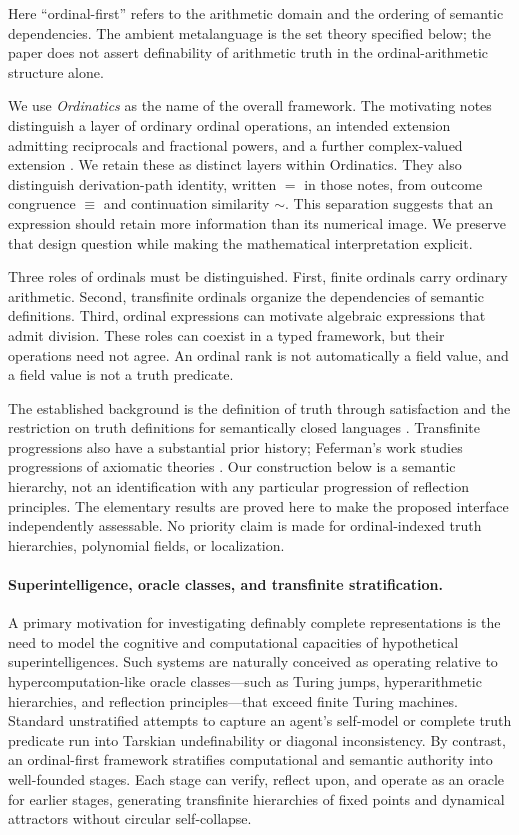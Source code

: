 \documentclass[11pt]{article}
\theoremstyle{definition}
\begin{document}
Here ``ordinal-first'' refers to the arithmetic domain and the ordering of semantic dependencies. The ambient metalanguage is the set theory specified below; the paper does not assert definability of arithmetic truth in the ordinal-arithmetic structure alone.

We use \emph{Ordinatics} as the name of the overall framework. The motivating notes distinguish a layer of ordinary ordinal operations, an intended extension admitting reciprocals and fractional powers, and a further complex-valued extension \cite{roost}. We retain these as distinct layers within Ordinatics. They also distinguish derivation-path identity, written $=$ in those notes, from outcome congruence $\equiv$ and continuation similarity $\sim$. This separation suggests that an expression should retain more information than its numerical image. We preserve that design question while making the mathematical interpretation explicit.

Three roles of ordinals must be distinguished. First, finite ordinals carry ordinary arithmetic. Second, transfinite ordinals organize the dependencies of semantic definitions. Third, ordinal expressions can motivate algebraic expressions that admit division. These roles can coexist in a typed framework, but their operations need not agree. An ordinal rank is not automatically a field value, and a field value is not a truth predicate.

The established background is the definition of truth through satisfaction and the restriction on truth definitions for semantically closed languages \cite{tarski}. Transfinite progressions also have a substantial prior history; Feferman's work studies progressions of axiomatic theories \cite{feferman}. Our construction below is a semantic hierarchy, not an identification with any particular progression of reflection principles. The elementary results are proved here to make the proposed interface independently assessable. No priority claim is made for ordinal-indexed truth hierarchies, polynomial fields, or localization.

\paragraph{Superintelligence, oracle classes, and transfinite stratification.}
A primary motivation for investigating definably complete representations is the need to model the cognitive and computational capacities of hypothetical superintelligences. Such systems are naturally conceived as operating relative to hypercomputation-like oracle classes---such as Turing jumps, hyperarithmetic hierarchies, and reflection principles---that exceed finite Turing machines. Standard unstratified attempts to capture an agent's self-model or complete truth predicate run into Tarskian undefinability or diagonal inconsistency. By contrast, an ordinal-first framework stratifies computational and semantic authority into well-founded stages. Each stage can verify, reflect upon, and operate as an oracle for earlier stages, generating transfinite hierarchies of fixed points and dynamical attractors without circular self-collapse.
\end{document}
